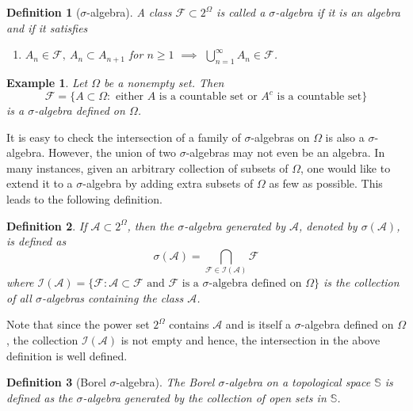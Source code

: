 \documentclass{report}
\newtheorem{definition}{Definition}[section]
\newtheorem{example}{Example}[section]
\theoremstyle{nonumberplain}
\begin{document}
\begin{definition}[$\sigma$-algebra]
	A class $\mathcal{F}\subset 2^{\Omega}$ is called a \emph{$\sigma$-algebra} if it is an algebra and if it satisfies
	\begin{enumerate}
		\item [(d')] $A_n\in\mathcal{F},\ A_n\subset A_{n+1}$ for $n\ge 1$ $\implies$ $\bigcup\limits_{n=1}^\infty A_n\in\mathcal{F}$.
	\end{enumerate}
\end{definition}

\begin{example}
	Let $\Omega$ be a nonempty set. Then
	\[
	\mathcal{F} = \{A\subset \Omega : \text{ either }A\text{ is a countable set or }A^c\text{ is a countable set}\}
	\]
	is a $\sigma$-algebra defined on $\Omega$.
\end{example}
It is easy to check the intersection of a family of $\sigma$-algebras on $\Omega$ is also a $\sigma$-algebra. However, the union of two $\sigma$-algebras may not even be an algebra. In many instances, given an arbitrary collection of subsets of $\Omega$, one would like to extend it to a $\sigma$-algebra by adding extra subsets of $\Omega$ as few as possible. This leads to the following definition.

\begin{definition}
If $\mathcal{A}\subset2^\Omega$, then the \emph{$\sigma$-algebra generated by} $\mathcal{A}$, denoted by $\sigma(\mathcal{A})$, is defined as
\[
\sigma(\mathcal{A})=\bigcap_{\mathcal{F}\in\mathcal{I}(\mathcal{A})}\mathcal{F}
\]
where $\mathcal{I}(\mathcal{A})=\{\mathcal{F}:\mathcal{A}\subset \mathcal{F}\text{ and }\mathcal{F}\text{ is a }\sigma\text{-algebra defined on }\Omega\}$ is the collection of all $\sigma$-algebras containing the class $\mathcal{A}$.
\end{definition}
Note that since the power set $2^\Omega$ contains $\mathcal{A}$ and is itself a $\sigma$-algebra defined on $\Omega$, the collection $\mathcal{I}(\mathcal{A})$ is not empty and hence, the intersection in the above definition is well defined.

\begin{definition}[Borel $\sigma$-algebra]
	The \emph{Borel $\sigma$-algebra} on a topological space $\mathbb{S}$ is defined as the $\sigma$-algebra	generated by the collection of open sets in $\mathbb{S}$.
\end{definition}
\end{document}
